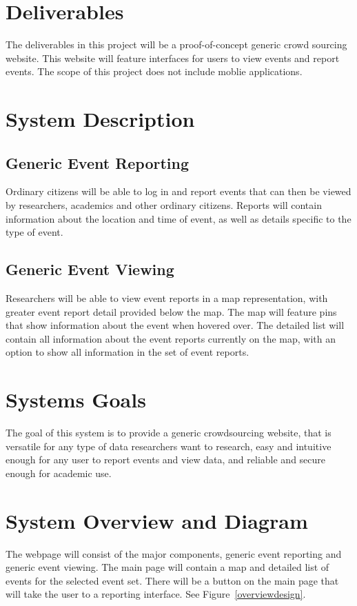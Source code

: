\section{Deliverables}
The deliverables in this project will be a proof-of-concept generic crowd sourcing website. This website will feature interfaces for users to view events and report events. The scope of this project does not include moblie applications. 

\section{System Description}

\subsection{Generic Event Reporting}
Ordinary citizens will be able to log in and report events that can then be viewed by researchers, academics and other ordinary citizens. Reports will contain information about the location and time of event, as well as details specific to the type of event.

\subsection{Generic Event Viewing}
Researchers will be able to view event reports in a map representation, with greater event report detail provided below the map. The map will feature pins that show information about the event when hovered over. The detailed list will contain all information about the event reports currently on the map, with an option to show all information in the set of event reports.

\section{Systems Goals}
The goal of this system is to provide a generic crowdsourcing website, that is versatile for any type of data researchers want to research, easy and intuitive enough for any user to report events and view data, and reliable and secure enough for academic use.

\section{System Overview and Diagram}
The webpage will consist of the major components, generic event reporting and generic event viewing. The main page will contain a map and detailed list of events for the selected event set. There will be a button on the main page that will take the user to a reporting interface.  See Figure~\ref{overviewdesign}.

